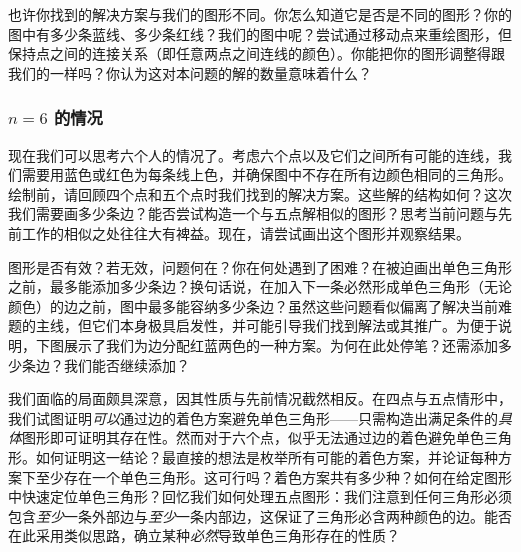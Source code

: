 也许你找到的解决方案与我们的图形不同。你怎么知道它是否是不同的图形？你的图中有多少条蓝线、多少条红线？我们的图中呢？尝试通过移动点来重绘图形，但保持点之间的连接关系（即任意两点之间连线的颜色）。你能把你的图形调整得跟我们的一样吗？你认为这对本问题的解的数量意味着什么？

\subsubsection*{$n=6$ 的情况}

现在我们可以思考六个人的情况了。考虑六个点以及它们之间所有可能的连线，我们需要用蓝色或红色为每条线上色，并确保图中不存在所有边颜色相同的三角形。绘制前，请回顾四个点和五个点时我们找到的解决方案。这些解的结构如何？这次我们需要画多少条边？能否尝试构造一个与五点解相似的图形？思考当前问题与先前工作的相似之处往往大有裨益。现在，请尝试画出这个图形并观察结果。

图形是否有效？若无效，问题何在？你在何处遇到了困难？在被迫画出单色三角形之前，最多能添加多少条边？换句话说，在加入下一条必然形成单色三角形（无论颜色）的边之前，图中最多能容纳多少条边？虽然这些问题看似偏离了解决当前难题的主线，但它们本身极具启发性，并可能引导我们找到解法或其推广。为便于说明，下图展示了我们为边分配红蓝两色的一种方案。为何在此处停笔？还需添加多少条边？我们能否继续添加？

\begin{center}
\end{center}

我们面临的局面颇具深意，因其性质与先前情况截然相反。在四点与五点情形中，我们试图证明\emph{可以}通过边的着色方案避免单色三角形——只需构造出满足条件的\emph{具体}图形即可证明其存在性。然而对于六个点，似乎无法通过边的着色避免单色三角形。如何证明这一结论？最直接的想法是枚举所有可能的着色方案，并论证每种方案下至少存在一个单色三角形。这可行吗？着色方案共有多少种？如何在给定图形中快速定位单色三角形？回忆我们如何处理五点图形：我们注意到任何三角形必须包含\emph{至少}一条外部边与\emph{至少}一条内部边，这保证了三角形必含两种颜色的边。能否在此采用类似思路，确立某种\emph{必然}导致单色三角形存在的性质？

